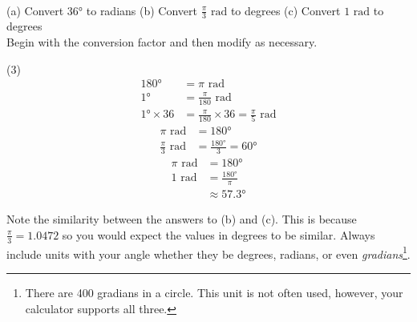 \example\medskip\\
(a) Convert \ang{36} to radians\hspace{0.7cm} 
(b) Convert $\displaystyle\frac{\pi }{3}$ $\mbox{rad}$ to degrees \hspace{0.7cm} 
(c) Convert $1$ $\mbox{rad}$ to degrees \medskip\\

\solution Begin with the conversion factor and then modify as necessary.
\begin{tasks}[before-skip = {0ex} , after-skip={-5ex}](3)
\task \begin{align*}\ang{180}  &  =  \pi \text{ rad} \\
\ang{1}  &  =  \frac{\pi }{180}\text{ rad} \\
\ang{1} \times 36 &  =  \frac{\pi }{180} \times 36 =\frac{\pi }{5}\text{ rad}\end{align*}
\task
\begin{align*}\pi  \text{ rad} &  =  \ang{180}  \\
\frac{\pi }{3} \text{ rad} &  = \frac{\ang{180} }{3} =\ang{60} \end{align*}
\task
\begin{align*}\pi  \text{ rad} &  =  \ang{180} \\
1 \text{ rad} &  =  \frac{\ang{180} }{\pi } \\
 &  \approx   \ang{57.3} \end{align*}
\end{tasks}
Note the similarity between the answers to (b) and (c). This is because $\frac{\pi }{3} =1.0472$ so you would expect the values in degrees to be similar. Always include units with your angle whether they be degrees, radians, or even \textit{gradians}\footnote{There are 400 gradians in a circle. This unit is not often used, however, your calculator supports all three.}.

